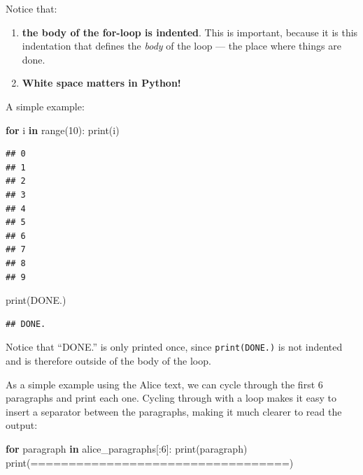 \documentclass[
]{book}
\newenvironment{Shaded}{\begin{snugshade}}{\end{snugshade}}
\newcommand{\BuiltInTok}[1]{#1}
\newcommand{\ControlFlowTok}[1]{\textcolor[rgb]{0.13,0.29,0.53}{\textbf{#1}}}
\newcommand{\DecValTok}[1]{\textcolor[rgb]{0.00,0.00,0.81}{#1}}
\newcommand{\KeywordTok}[1]{\textcolor[rgb]{0.13,0.29,0.53}{\textbf{#1}}}
\newcommand{\NormalTok}[1]{#1}
\newcommand{\StringTok}[1]{\textcolor[rgb]{0.31,0.60,0.02}{#1}}
\providecommand{\tightlist}{%
  \setlength{\itemsep}{0pt}\setlength{\parskip}{0pt}}
\begin{document}
Notice that:

\begin{enumerate}
\def\labelenumi{\arabic{enumi}.}
\tightlist
\item
  \textbf{the body of the for-loop is indented}. This is important, because it is this indentation that defines the \emph{body} of the loop --- the place where things are done.
\item
  \textbf{White space matters in Python!}
\end{enumerate}

A simple example:

\begin{Shaded}
\begin{Highlighting}[]
\ControlFlowTok{for}\NormalTok{ i }\KeywordTok{in} \BuiltInTok{range}\NormalTok{(}\DecValTok{10}\NormalTok{):}
    \BuiltInTok{print}\NormalTok{(i)}
\end{Highlighting}
\end{Shaded}

\begin{verbatim}
## 0
## 1
## 2
## 3
## 4
## 5
## 6
## 7
## 8
## 9
\end{verbatim}

\begin{Shaded}
\begin{Highlighting}[]
\BuiltInTok{print}\NormalTok{(}\StringTok{\textquotesingle{}DONE.\textquotesingle{}}\NormalTok{)}
\end{Highlighting}
\end{Shaded}

\begin{verbatim}
## DONE.
\end{verbatim}

Notice that ``DONE.'' is only printed once, since \texttt{print(\textquotesingle{}DONE.\textquotesingle{})} is not indented and is therefore outside of the body of the loop.

As a simple example using the Alice text, we can cycle through the first 6 paragraphs and print each one. Cycling through with a loop makes it easy to insert a separator between the paragraphs, making it much clearer to read the output:

\begin{Shaded}
\begin{Highlighting}[]
\ControlFlowTok{for}\NormalTok{ paragraph }\KeywordTok{in}\NormalTok{ alice\_paragraphs[:}\DecValTok{6}\NormalTok{]:}
    \BuiltInTok{print}\NormalTok{(paragraph)}
    \BuiltInTok{print}\NormalTok{(}\StringTok{\textquotesingle{}==================================\textquotesingle{}}\NormalTok{)}
\end{Highlighting}
\end{Shaded}
\end{document}
